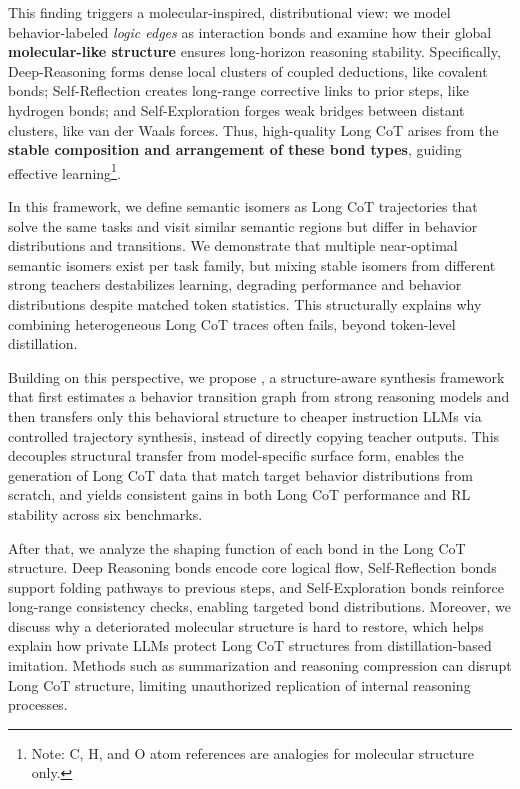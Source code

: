 This finding triggers a molecular-inspired, distributional view: we model behavior-labeled \emph{logic edges} as interaction bonds and examine how their global \textbf{molecular-like structure} ensures long-horizon reasoning stability. Specifically, Deep-Reasoning forms dense local clusters of coupled deductions, like covalent bonds; Self-Reflection creates long-range corrective links to prior steps, like hydrogen bonds; and Self-Exploration forges weak bridges between distant clusters, like van der Waals forces. Thus, high-quality Long CoT arises from the {\textbf{stable composition and arrangement of these bond types}}, guiding effective learning\footnote{Note: C, H, and O atom references are analogies for molecular structure only.}.

In this framework, we define semantic isomers as Long CoT trajectories that solve the same tasks and visit similar semantic regions but differ in behavior distributions and transitions. We demonstrate that multiple near-optimal semantic isomers exist per task family, but mixing stable isomers from different strong teachers destabilizes learning, degrading performance and behavior distributions despite matched token statistics. This structurally explains why combining heterogeneous Long CoT traces often fails, beyond token-level distillation.



Building on this perspective, we propose \method, a structure-aware synthesis framework that first estimates a behavior transition graph from strong reasoning models and then transfers only this behavioral structure to cheaper instruction LLMs via controlled trajectory synthesis, instead of directly copying teacher outputs. This decouples structural transfer from model-specific surface form, enables the generation of Long CoT data that match target behavior distributions from scratch, and yields consistent gains in both Long CoT performance and RL stability across six  benchmarks.







After that, we analyze the shaping function of each bond in the Long CoT structure. Deep Reasoning bonds encode core logical flow, Self-Reflection bonds support folding pathways to previous steps, and Self-Exploration bonds reinforce long-range consistency checks, enabling targeted bond distributions. Moreover, we discuss why a deteriorated molecular structure is hard to restore, which helps explain how private LLMs protect Long CoT structures from distillation-based imitation. Methods such as summarization and reasoning compression can disrupt Long CoT structure, limiting unauthorized replication of internal reasoning processes.




